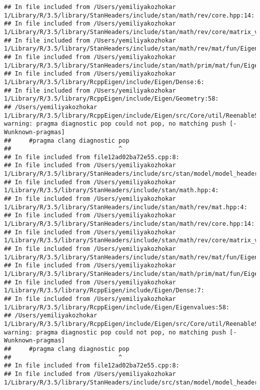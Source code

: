 \documentclass[]{article}
\begin{document}
\begin{verbatim}
## In file included from /Users/yemiliyakozhokar 1/Library/R/3.5/library/StanHeaders/include/stan/math/rev/core.hpp:14:
## In file included from /Users/yemiliyakozhokar 1/Library/R/3.5/library/StanHeaders/include/stan/math/rev/core/matrix_vari.hpp:4:
## In file included from /Users/yemiliyakozhokar 1/Library/R/3.5/library/StanHeaders/include/stan/math/rev/mat/fun/Eigen_NumTraits.hpp:4:
## In file included from /Users/yemiliyakozhokar 1/Library/R/3.5/library/StanHeaders/include/stan/math/prim/mat/fun/Eigen.hpp:4:
## In file included from /Users/yemiliyakozhokar 1/Library/R/3.5/library/RcppEigen/include/Eigen/Dense:6:
## In file included from /Users/yemiliyakozhokar 1/Library/R/3.5/library/RcppEigen/include/Eigen/Geometry:58:
## /Users/yemiliyakozhokar 1/Library/R/3.5/library/RcppEigen/include/Eigen/src/Core/util/ReenableStupidWarnings.h:10:30: warning: pragma diagnostic pop could not pop, no matching push [-Wunknown-pragmas]
##     #pragma clang diagnostic pop
##                              ^
## In file included from file12ad02ba72e55.cpp:8:
## In file included from /Users/yemiliyakozhokar 1/Library/R/3.5/library/StanHeaders/include/src/stan/model/model_header.hpp:4:
## In file included from /Users/yemiliyakozhokar 1/Library/R/3.5/library/StanHeaders/include/stan/math.hpp:4:
## In file included from /Users/yemiliyakozhokar 1/Library/R/3.5/library/StanHeaders/include/stan/math/rev/mat.hpp:4:
## In file included from /Users/yemiliyakozhokar 1/Library/R/3.5/library/StanHeaders/include/stan/math/rev/core.hpp:14:
## In file included from /Users/yemiliyakozhokar 1/Library/R/3.5/library/StanHeaders/include/stan/math/rev/core/matrix_vari.hpp:4:
## In file included from /Users/yemiliyakozhokar 1/Library/R/3.5/library/StanHeaders/include/stan/math/rev/mat/fun/Eigen_NumTraits.hpp:4:
## In file included from /Users/yemiliyakozhokar 1/Library/R/3.5/library/StanHeaders/include/stan/math/prim/mat/fun/Eigen.hpp:4:
## In file included from /Users/yemiliyakozhokar 1/Library/R/3.5/library/RcppEigen/include/Eigen/Dense:7:
## In file included from /Users/yemiliyakozhokar 1/Library/R/3.5/library/RcppEigen/include/Eigen/Eigenvalues:58:
## /Users/yemiliyakozhokar 1/Library/R/3.5/library/RcppEigen/include/Eigen/src/Core/util/ReenableStupidWarnings.h:10:30: warning: pragma diagnostic pop could not pop, no matching push [-Wunknown-pragmas]
##     #pragma clang diagnostic pop
##                              ^
## In file included from file12ad02ba72e55.cpp:8:
## In file included from /Users/yemiliyakozhokar 1/Library/R/3.5/library/StanHeaders/include/src/stan/model/model_header.hpp:4:

\end{verbatim}
\end{document}
